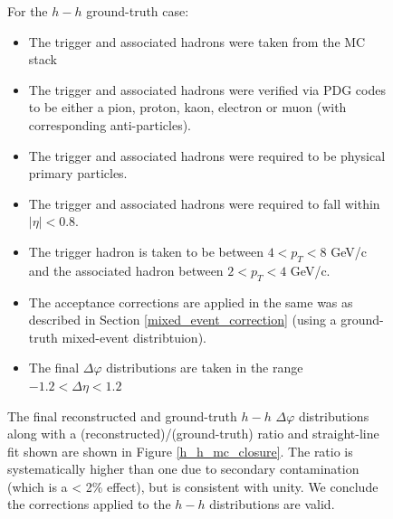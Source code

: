 \documentclass[ALICE,manyauthors]{ALICE_analysis_notes}
\begin{document}
\begin{figure}[ht]
For the $h-h$ ground-truth case: 
\begin{itemize}
\item The trigger and associated hadrons were taken from the MC stack 
\item The trigger and associated hadrons were verified via PDG codes to be either a pion, proton, kaon, electron or muon (with corresponding anti-particles).
\item The trigger and associated hadrons were required to be physical primary particles.
\item The trigger and associated hadrons were required to fall within $|\eta| < 0.8$.
\item The trigger hadron is taken to be between $4 < p_{T} < 8$ GeV/c and the associated hadron between $2 < p_{T} < 4$ GeV/c. 
\item The acceptance corrections are applied in the same was as described in Section \ref{mixed_event_correction} (using a ground-truth mixed-event distribtuion). 
\item The final $\Delta\varphi$ distributions are taken in the range $-1.2 < \Delta\eta < 1.2$
\end{itemize}

The final reconstructed and ground-truth $h-h$ $\Delta\varphi$ distributions along with a (reconstructed)/(ground-truth) ratio and straight-line fit shown are shown in Figure \ref{h_h_mc_closure}. The ratio is systematically higher than one due to secondary contamination (which is a < 2\% effect), but is consistent with unity. We conclude the corrections applied to the $h-h$ distributions are valid.


\end{figure}
\end{document}
